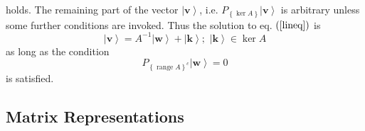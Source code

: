 \documentclass[aps,preprint]{revtex4}%
\begin{document}
holds. The remaining part of the vector $\left|  \mathbf{v}\right\rangle $,
i.e. $P_{\left\{  \ker A\right\}  }\left|  \mathbf{v}\right\rangle $ is
arbitrary unless some further conditions are invoked. Thus the solution to eq.
$\left(  \ref{lineq}\right)  $ is
\begin{equation}
\left|  \mathbf{v}\right\rangle =A^{-1}\left|  \mathbf{w}\right\rangle
+\left|  \mathbf{k}\right\rangle ;\,\,\left|  \mathbf{k}\right\rangle \in\ker
A
\end{equation}
as long as the condition
\begin{equation}
P_{\left\{  \operatorname{range}A\right\}  ^{c}}\left|  \mathbf{w}%
\right\rangle =0
\end{equation}
is satisfied.

\subsection{Matrix Representations}
\end{document}
